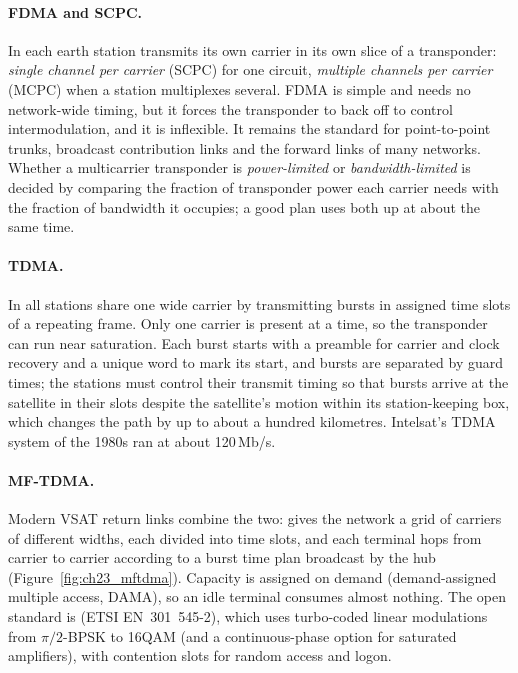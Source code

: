 \paragraph{FDMA and SCPC.} In  each earth station
transmits its own carrier in its own slice of a transponder: \emph{single channel per carrier}
(SCPC) for one circuit, \emph{multiple channels per carrier} (MCPC) when a station multiplexes
several. FDMA is simple and needs no network-wide timing, but it forces the transponder to
back off to control intermodulation, and it is inflexible. It remains the standard for
point-to-point trunks, broadcast contribution links and the forward links of many networks.
Whether a multicarrier transponder is \emph{power-limited} or \emph{bandwidth-limited} is decided
by comparing the fraction of transponder power each carrier needs with the fraction of bandwidth
it occupies; a good plan uses both up at about the same time.

\paragraph{TDMA.} In  all stations share one wide carrier by
transmitting bursts in assigned time slots of a repeating frame. Only one carrier is present at a
time, so the transponder can run near saturation. Each burst starts with a preamble for carrier
and clock recovery and a unique word to mark its start, and bursts are separated by guard times;
the stations must control their transmit timing so that bursts arrive at the satellite in their
slots despite the satellite's motion within its station-keeping box, which changes the path by
up to about a hundred kilometres. Intelsat's TDMA system of the 1980s ran at about 120\,Mb/s.

\paragraph{MF-TDMA.} Modern VSAT return links combine the two:  gives
the network a grid of carriers of different widths, each divided into time slots, and each
terminal hops from carrier to carrier according to a burst time plan broadcast by the hub
(Figure~\ref{fig:ch23_mftdma}). Capacity is assigned on demand (demand-assigned multiple access,
DAMA), so an idle terminal consumes almost nothing. The open standard is 
(ETSI EN~301~545-2), which uses turbo-coded linear modulations from $\pi/2$-BPSK to 16QAM (and a
continuous-phase option for saturated amplifiers), with contention slots for random access and
logon.

